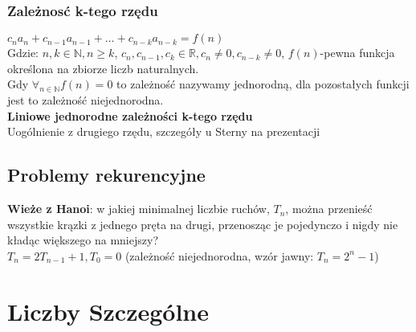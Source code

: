 \documentclass[a4paper,12pt]{article}
\begin{document}
\subsubsection{Zależnosć k-tego rzędu}
$c_na_n+c_{n-1}a_{n-1}+\dots + c_{n-k}a_{n-k}=f(n)$\\
Gdzie: $n,k\in\mathbb{N}, n\geq k$, $c_n,c_{n-1}, c_k\in\mathbb{R}, c_n\neq0, c_{n-k}\neq0$, $f(n)$-pewna funkcja określona na zbiorze liczb naturalnych.\\
Gdy $\forall_{n \in\mathbb{N}}f(n)=0$ to zależność nazywamy jednorodną, dla pozostałych funkcji  jest to zależność niejednorodna. \\
\textbf{Liniowe jednorodne zależności k-tego rzędu}\\
Uogólnienie z drugiego rzędu, szczegóły u Sterny na prezentacji
\subsection{Problemy rekurencyjne}
\textbf{Wieże z Hanoi}: w jakiej minimalnej liczbie ruchów, $T_n$, można przenieść wszystkie krązki z jednego pręta na drugi, przenosząc je pojedynczo i nigdy nie kładąc większego na mniejszy?\\
$T_n=2T_{n-1}+1, T_0=0$ (zależność niejednorodna, wzór jawny: $T_n=2^n-1$)

\section{Liczby Szczególne}
\end{document}
